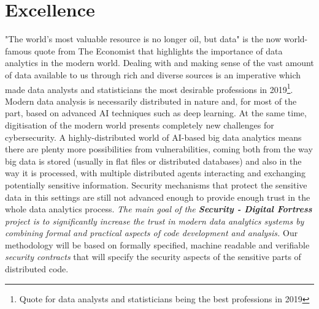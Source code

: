 \documentclass[a4paper,11pt]{article}
\newcommand{\project}[1]{\textbf{#1}\xspace}
\newcommand{\SECURITY}{\project{Security - Digital Fortress}}
\newcommand{\TheProject}{\SECURITY}
\begin{document}




\section{Excellence}
"The world's most valuable resource is no longer oil, but data" is the now world-famous quote from The Economist that highlights the importance of data analytics in the modern world. Dealing with and making sense of the vast amount of data available to us through rich and diverse %
sources is an imperative which made data analysts and statisticians the most desirable professions in 2019\footnote{Quote for data analysts and statisticians being the best professions in 2019}. Modern data analysis is necessarily distributed in nature and, for most of the part, based on advanced AI techniques such as deep learning. At the same time, digitisation of the modern world presents completely new challenges for cybersecurity. A highly-distributed world of AI-based big data analytics means there are plenty more possibilities from vulnerabilities, coming both from the way big data is stored (usually in flat files or distributed databases) and also in the way it is processed, with multiple distributed agents interacting and exchanging potentially sensitive information. Security mechanisms that protect the sensitive data in this settings are still not advanced enough to provide enough trust in the whole data analytics process. \emph{The main goal of the \TheProject{} project is to significantly increase the trust in modern data analytics systems by combining formal and practical aspects of code development and analysis.} Our methodology will be based on formally specified, machine readable and verifiable \emph{security contracts} that will specify the security aspects of the sensitive parts of distributed code.
\end{document}
